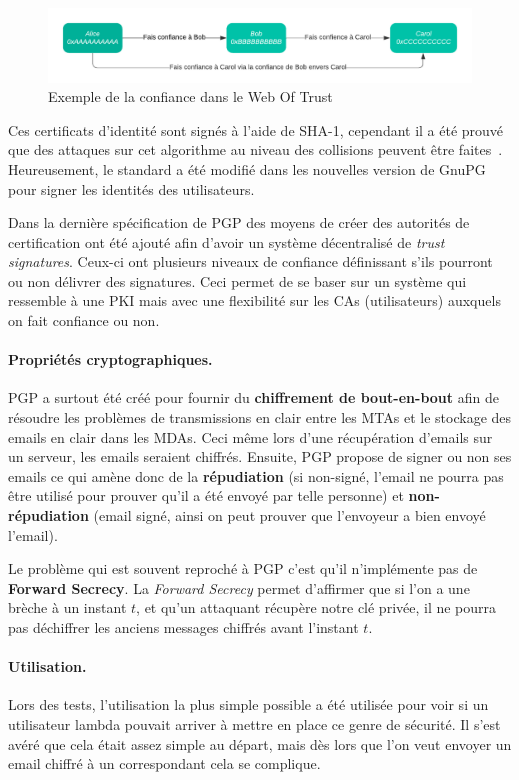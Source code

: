 \begin{figure}[h!]
	\includegraphics[width=\textwidth]{images/WOTExample.pdf}
	\centering
	\caption{Exemple de la confiance dans le Web Of Trust}
	\label{fig:WOTExample}
\end{figure}

Ces certificats d'identité sont signés à l'aide de SHA-1, cependant il a été prouvé que des attaques sur cet algorithme au niveau des collisions peuvent être faites~\cite{journals/iacr/LeurentP20}. Heureusement, le standard a été modifié dans les nouvelles version de GnuPG pour signer les identités des utilisateurs.

Dans la dernière spécification de PGP des moyens de créer des autorités de certification ont été ajouté afin d'avoir un système décentralisé de \textit{trust signatures}. Ceux-ci ont plusieurs niveaux de confiance définissant s'ils pourront ou non délivrer des signatures. Ceci permet de se baser sur un système qui ressemble à une PKI mais avec une flexibilité sur les CAs (utilisateurs) auxquels on fait confiance ou non.
\paragraph*{Propriétés cryptographiques.}
PGP a surtout été créé pour fournir du \textbf{chiffrement de bout-en-bout} afin de résoudre les problèmes de transmissions en clair entre les MTAs et le stockage des emails en clair dans les MDAs. Ceci même lors d'une récupération d'emails sur un serveur, les emails seraient chiffrés. Ensuite, PGP propose de signer ou non ses emails ce qui amène donc de la \textbf{répudiation} (si non-signé, l'email ne pourra pas être utilisé pour prouver qu'il a été envoyé par telle personne) et \textbf{non-répudiation} (email signé, ainsi on peut prouver que l'envoyeur a bien envoyé l'email).

Le problème qui est souvent reproché à PGP c'est qu'il n'implémente pas de \textbf{Forward Secrecy}. La \textit{Forward Secrecy} permet d'affirmer que si l'on a une brèche à un instant $t$, et qu'un attaquant récupère notre clé privée, il ne pourra pas déchiffrer les anciens messages chiffrés avant l'instant $t$.
\paragraph*{Utilisation.}
Lors des tests, l’utilisation la plus simple possible a été utilisée pour voir si un utilisateur lambda pouvait arriver à mettre en place ce genre de sécurité. Il s’est avéré que cela était assez simple au départ, mais dès lors que l'on veut envoyer un email chiffré à un correspondant cela se complique.

